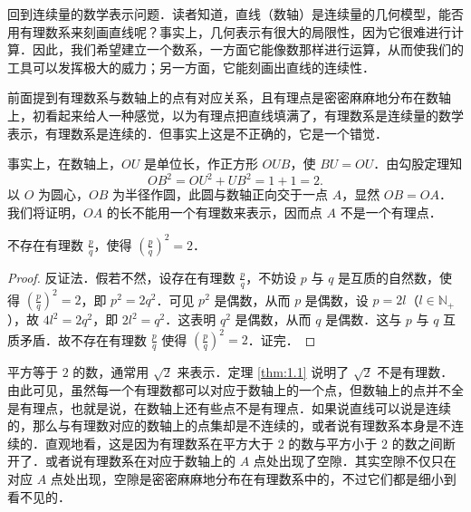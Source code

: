 回到连续量的数学表示问题．读者知道，直线（数轴）是连续量的几何模型，能否用有理数系来刻画直线呢？事实上，几何表示有很大的局限性，因为它很难进行计算．因此，我们希望建立一个数系，一方面它能像数那样进行运算，从而使我们的工具可以发挥极大的威力；另一方面，它能刻画出直线的连续性．

前面提到有理数系与数轴上的点有对应关系，且有理点是密密麻麻地分布在数轴上，初看起来给人一种感觉，以为有理点把直线填满了，有理数系是连续量的数学表示，有理数系是连续的．但事实上这是不正确的，它是一个错觉．

事实上，在数轴上，$OU$ 是单位长，作正方形 $OUB$，使 $BU=OU$．由勾股定理知
\[
OB^2 = OU^2 + UB^2 = 1 + 1 = 2.
\]
以 $O$ 为圆心，$OB$ 为半径作圆，此圆与数轴正向交于一点 $A$，显然 $OB=OA$．我们将证明，$OA$ 的长不能用一个有理数来表示，因而点 $A$ 不是一个有理点．
\begin{figure}[htbp]
\centering
{}
\caption{\relax}\label{fig:1-2}
\end{figure}

\begin{theorem}
不存在有理数 $\frac{p}{q}$，使得 $\left(\frac{p}{q}\right)^2 = 2$．
\label{thm:1.1}
\end{theorem}

\begin{proof}
反证法．假若不然，设存在有理数 $\frac{p}{q}$，不妨设 $p$ 与 $q$ 是互质的自然数，使得 $\left(\frac{p}{q}\right)^2 = 2$，即 $p^2 = 2q^2$．可见 $p^2$ 是偶数，从而 $p$ 是偶数，设 $p=2l$（$l\in\mathbb{N}_+$），故 $4l^2 = 2q^2$，即 $2l^2 = q^2$．这表明 $q^2$ 是偶数，从而 $q$ 是偶数．这与 $p$ 与 $q$ 互质矛盾．故不存在有理数 $\frac{p}{q}$ 使得 $\left(\frac{p}{q}\right)^2=2$．证完．
\end{proof}

平方等于 $2$ 的数，通常用 $\sqrt{2}$ 来表示．定理 \ref{thm:1.1} 说明了 $\sqrt{2}$ 不是有理数．由此可见，虽然每一个有理数都可以对应于数轴上的一个点，但数轴上的点并不全是有理点，也就是说，在数轴上还有些点不是有理点．如果说直线可以说是连续的，那么与有理数对应的数轴上的点集却是不连续的，或者说有理数系本身是不连续的．直观地看，这是因为有理数系在平方大于 $2$ 的数与平方小于 $2$ 的数之间断开了．或者说有理数系在对应于数轴上的 $A$ 点处出现了空隙．其实空隙不仅只在对应 $A$ 点处出现，空隙是密密麻麻地分布在有理数系中的，不过它们都是细小到看不见的．

